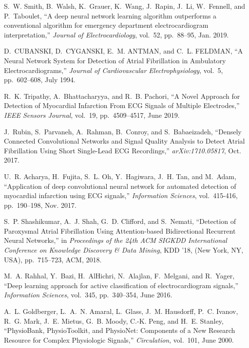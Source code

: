 \documentclass{article}
\begin{document}
\begin{thebibliography}{10}
S.~W. Smith, B.~Walsh, K.~Grauer, K.~Wang, J.~Rapin, J.~Li, W.~Fennell, and
  P.~Taboulet, ``A deep neural network learning algorithm outperforms a
  conventional algorithm for emergency department electrocardiogram
  interpretation,'' {\em Journal of Electrocardiology}, vol.~52, pp.~88--95,
  Jan. 2019.

D.~CUBANSKI, D.~CYGANSKI, E.~M. ANTMAN, and C.~L. FELDMAN, ``A {{Neural Network
  System}} for {{Detection}} of {{Atrial Fibrillation}} in {{Ambulatory
  Electrocardiograms}},'' {\em Journal of Cardiovascular Electrophysiology},
  vol.~5, pp.~602--608, July 1994.

R.~K. Tripathy, A.~Bhattacharyya, and R.~B. Pachori, ``A {{Novel Approach}} for
  {{Detection}} of {{Myocardial Infarction From ECG Signals}} of {{Multiple
  Electrodes}},'' {\em IEEE Sensors Journal}, vol.~19, pp.~4509--4517, June
  2019.

J.~Rubin, S.~Parvaneh, A.~Rahman, B.~Conroy, and S.~Babaeizadeh, ``Densely
  {{Connected Convolutional Networks}} and {{Signal Quality Analysis}} to
  {{Detect Atrial Fibrillation Using Short Single}}-{{Lead ECG Recordings}},''
  {\em arXiv:1710.05817}, Oct. 2017.

U.~R. Acharya, H.~Fujita, S.~L. Oh, Y.~Hagiwara, J.~H. Tan, and M.~Adam,
  ``Application of deep convolutional neural network for automated detection of
  myocardial infarction using {{ECG}} signals,'' {\em Information Sciences},
  vol.~415-416, pp.~190--198, Nov. 2017.

S.~P. Shashikumar, A.~J. Shah, G.~D. Clifford, and S.~Nemati, ``Detection of
  {{Paroxysmal Atrial Fibrillation Using Attention}}-based {{Bidirectional
  Recurrent Neural Networks}},'' in {\em Proceedings of the 24th {{ACM SIGKDD
  International Conference}} on {{Knowledge Discovery}} \& {{Data Mining}}},
  {{KDD}} '18, (New York, NY, USA), pp.~715--723, {ACM}, 2018.

M.~A. Rahhal, Y.~Bazi, H.~AlHichri, N.~Alajlan, F.~Melgani, and R.~Yager,
  ``Deep learning approach for active classification of electrocardiogram
  signals,'' {\em Information Sciences}, vol.~345, pp.~340--354, June 2016.

A.~L. Goldberger, L.~A.~N. Amaral, L.~Glass, J.~M. Hausdorff, P.~C. Ivanov,
  R.~G. Mark, J.~E. Mietus, G.~B. Moody, C.-K. Peng, and H.~E. Stanley,
  ``{{PhysioBank}}, {{PhysioToolkit}}, and {{PhysioNet}}: {{Components}} of a
  {{New Research Resource}} for {{Complex Physiologic Signals}},'' {\em
  Circulation}, vol.~101, June 2000.


\end{thebibliography}
\end{document}
